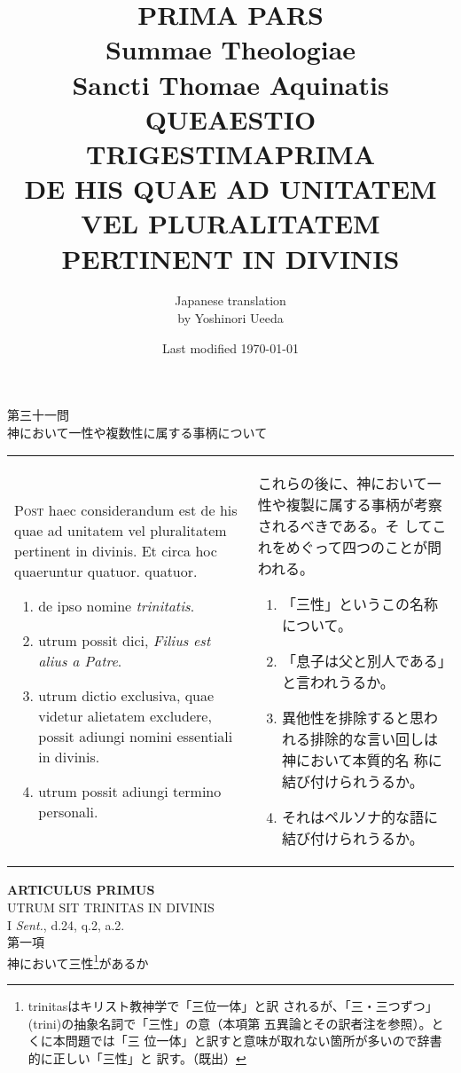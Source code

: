 \documentclass[10pt]{jsarticle} %
\title{{\bf PRIMA PARS}\\{\HUGE Summae Theologiae}\\Sancti Thomae
Aquinatis\\{\sffamily QUEAESTIO TRIGESTIMAPRIMA}\\DE HIS QUAE AD
UNITATEM VEL PLURALITATEM PERTINENT IN DIVINIS}
\author{Japanese translation\\by Yoshinori {\sc Ueeda}}
\date{Last modified \today}
\begin{document}
\maketitle

\begin{center}
{\Large 第三十一問\\神において一性や複数性に属する事柄について}
\end{center}


\begin{longtable}{p{21em}p{21em}}

{\Huge P}{\scshape ost} haec considerandum est de his quae ad unitatem
 vel pluralitatem pertinent in divinis. Et circa hoc quaeruntur quatuor.
quatuor. 

\begin{enumerate}
 \item de ipso nomine {\itshape trinitatis}.
 \item utrum possit dici, {\itshape Filius est alius a Patre}.
 \item utrum dictio exclusiva, quae videtur alietatem excludere,
       possit adiungi nomini essentiali in divinis.
 \item utrum possit adiungi termino personali.
\end{enumerate}


&



これらの後に、神において一性や複製に属する事柄が考察されるべきである。そ
 してこれをめぐって四つのことが問われる。

\begin{enumerate}
 \item 「三性」というこの名称について。
 \item 「息子は父と別人である」と言われうるか。
 \item 異他性を排除すると思われる排除的な言い回しは神において本質的名
       称に結び付けられうるか。
 \item それはペルソナ的な語に結び付けられうるか。
\end{enumerate}

\end{longtable}




\newpage

\begin{center}
{\Large {\bf ARTICULUS PRIMUS}}\\
{\large UTRUM SIT TRINITAS IN DIVINIS}\\
{\footnotesize I {\itshape Sent.}, d.24, q.2, a.2.}\\
{\Large 第一項\\神において三性\footnote{trinitasはキリスト教神学で「三位一体」と訳
 されるが、「三・三つずつ」(trini)の抽象名詞で「三性」の意（本項第
 五異論とその訳者注を参照）。とくに本問題では「三
 位一体」と訳すと意味が取れない箇所が多いので辞書的に正しい「三性」と
 訳す。（既出）}があるか}
\end{center}
\end{document}
